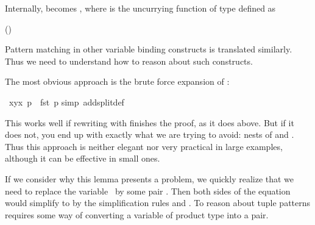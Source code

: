 \begin{isabellebody}
\begin{isamarkuptext}
Internally,  becomes , where
 is the uncurrying function of type  defined as
\begin{center}
\hfill()
\end{center}
Pattern matching in
other variable binding constructs is translated similarly. Thus we need to
understand how to reason about such constructs.%
\end{isamarkuptext}%
%
%
\begin{isamarkuptext}%
The most obvious approach is the brute force expansion of :%
\end{isamarkuptext}%
\ {\isachardoublequote}{\isacharparenleft}{\isasymlambda}{\isacharparenleft}x{\isacharcomma}y{\isacharparenright}{\isachardot}x{\isacharparenright}\ p\ {\isacharequal}\ fst\ p{\isachardoublequote}\isanewline
{}simp\ add{\isacharcolon}split{\isacharunderscore}def{\isacharparenright}%
\begin{isamarkuptext}%
This works well if rewriting with  finishes the
proof, as it does above.  But if it does not, you end up with exactly what
we are trying to avoid: nests of  and . Thus this
approach is neither elegant nor very practical in large examples, although it
can be effective in small ones.

If we consider why this lemma presents a problem, 
we quickly realize that we need to replace the variable~ by some pair .  Then both sides of the
equation would simplify to  by the simplification rules
 and .  
To reason about tuple patterns requires some way of
converting a variable of product type into a pair.


\end{isamarkuptext}
\end{isabellebody}
